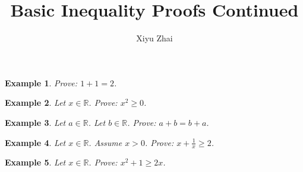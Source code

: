\documentclass{article}
\newtheorem{example}{Example}
\begin{document}
\title{Basic Inequality Proofs Continued}
\author{Xiyu Zhai}
\maketitle

\begin{example}
    Prove: $1+1=2$.
\end{example}


\begin{example}
    Let $x\in\mathbb{R}$. Prove: $x^2\ge 0$.
\end{example}

\begin{example}
    Let $a\in\mathbb{R}$. Let $b\in\mathbb{R}$. Prove: $a+b=b+a$.
\end{example}

\begin{example}
    Let $x\in\mathbb{R}$. Assume $x> 0$. Prove: $x + \frac{1}{x} \ge 2$.
\end{example}

\begin{example}
    Let $x\in\mathbb{R}$. Prove: $x^2 + 1\ge 2x$.
\end{example}
\end{document}
